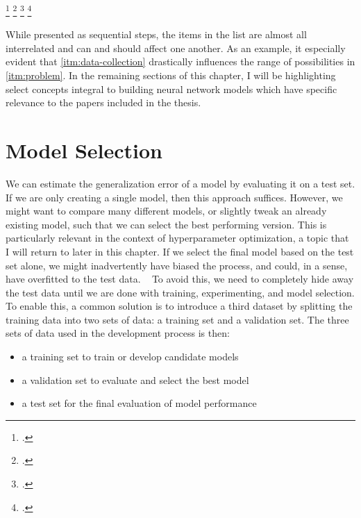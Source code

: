 \marginnote{\vspace{6em}}
\addtocounter{footnote}{-4} 
\footcitetext{cholletDeep2021}
\footcitetext{lecunHandwritten1989}
\footcitetext{cholletDeep2021}
\footcitetext{goodfellow2016deep}

While presented as sequential steps, 
the items in the list are almost all interrelated 
and can and should affect one another. 
As an example, 
it especially evident that
\cref{itm:data-collection} 
drastically influences the range of possibilities in 
\cref{itm:problem}.
In the remaining sections of this chapter, 
I will be highlighting select concepts integral to  
building neural network models which have specific
relevance to the papers included in the thesis.

\section{Model Selection}
\label{sec:model-selection}

We can estimate the generalization error of a model
by evaluating it on a test set.
If we are only creating a single model,
then this approach suffices. 
However, we might want to compare many different models,
or slightly tweak an already existing model,
such that we can select the best performing version.
This is particularly relevant in the context of hyperparameter optimization,
a topic that I will return to later in this chapter.
If we select the final model based on the test set alone,
we might inadvertently have biased the process,
and could, in a sense, have overfitted to the test data.
~\autocite{murphyMachine2012}
To avoid this, we need to completely hide away the test data
until we are done with training, experimenting, 
and model selection.
To enable this, a common solution is to introduce a third dataset by splitting 
the training data into two sets of data: a training set and a validation set.
The three sets of data used in the development process is then: 
%
\begin{itemize}
    \item a training set to train or develop candidate models
    \item a validation set to evaluate and select the best model
    \item a test set for the final evaluation of model performance
\end{itemize}


